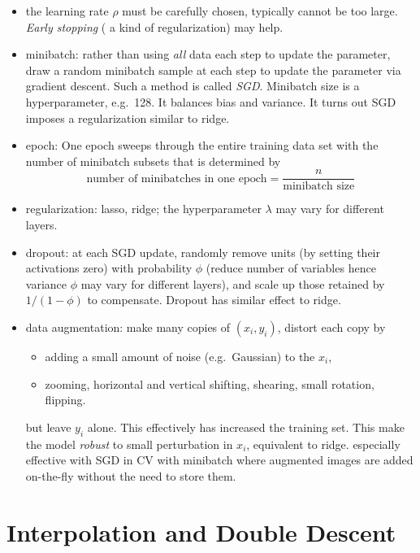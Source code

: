 \documentclass[
  letterpaper,
  DIV=11,
  numbers=noendperiod]{scrreprt}
\providecommand{\tightlist}{%
  \setlength{\itemsep}{0pt}\setlength{\parskip}{0pt}}\usepackage{longtable,booktabs,array}
\begin{document}
\begin{itemize}
\tightlist
\item
  the learning rate \(\rho\) must be carefully chosen, typically cannot
  be too large. \emph{Early stopping} ( a kind of regularization) may
  help.
\item
  minibatch: rather than using \emph{all} data each step to update the
  parameter, draw a random minibatch sample at each step to update the
  parameter via gradient descent. Such a method is called \emph{SGD}.
  Minibatch size is a hyperparameter, e.g.~128. It balances bias and
  variance. It turns out SGD imposes a regularization similar to ridge.
\item
  epoch: One epoch sweeps through the entire training data set with the
  number of minibatch subsets that is determined by\\
  \[ \text{number of minibatches in one epoch} = \frac{n}{\text{minibatch size}} \]
\item
  regularization: lasso, ridge; the hyperparameter \(\lambda\) may vary
  for different layers.
\item
  dropout: at each SGD update, randomly remove units (by setting their
  activations zero) with probability \(\phi\) (reduce number of
  variables hence variance \(\phi\) may vary for different layers), and
  scale up those retained by \(1/(1-\phi)\) to compensate. Dropout has
  similar effect to ridge.
\item
  data augmentation: make many copies of \((x_i, y_i)\), distort each
  copy by

  \begin{itemize}
  \tightlist
  \item
    adding a small amount of noise (e.g.~Gaussian) to the \(x_i\),
  \item
    zooming, horizontal and vertical shifting, shearing, small rotation,
    flipping.
  \end{itemize}

  but leave \(y_i\) alone. This effectively has increased the training
  set. This make the model \emph{robust} to small perturbation in
  \(x_i\), equivalent to ridge. especially effective with SGD in CV with
  minibatch where augmented images are added on-the-fly without the need
  to store them.
\end{itemize}

\section{Interpolation and Double
Descent}\label{interpolation-and-double-descent}
\end{document}

